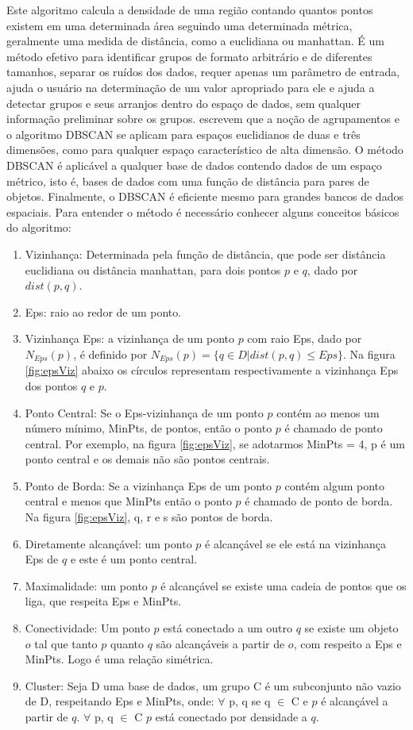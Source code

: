 Este algoritmo calcula a densidade de uma região contando quantos pontos existem em uma determinada área seguindo uma determinada métrica, geralmente uma medida de distância, como a euclidiana ou manhattan. 
É um método efetivo para identificar grupos de formato arbitrário e de diferentes tamanhos, separar os ruídos dos dados, requer apenas um parâmetro de entrada, ajuda o usuário na determinação de um valor apropriado para ele e ajuda a detectar grupos e seus arranjos dentro do espaço de dados, sem qualquer informação preliminar sobre os grupos.
\cite{ESTER1996}  escrevem que a noção de agrupamentos e o algoritmo DBSCAN se aplicam para espaços euclidianos de duas e três dimensões, como para qualquer espaço característico de alta dimensão. O método DBSCAN é aplicável a qualquer base de dados contendo dados de um espaço métrico, isto é, bases de dados com uma função de distância para pares de objetos. Finalmente, o DBSCAN é eficiente mesmo para grandes bancos de dados espaciais.
Para entender o método é necessário conhecer alguns conceitos básicos do algoritmo: 

\begin{enumerate}
	\item Vizinhança: Determinada pela função de distância, que pode ser distância euclidiana ou distância manhattan, para dois pontos ${p}$ e ${q}$, dado por ${dist(p,q)}$.
	\item Eps: raio ao redor de um ponto. 
	\item Vizinhança Eps: a vizinhança de um ponto ${p}$ com raio Eps, dado por ${N_{Eps}(p)}$, é definido por ${N_{Eps}(p) = \big\{ q \in D | dist(p, q)  \leqslant Eps\big\} }$. Na figura \ref{fig:epsViz} abaixo os círculos representam respectivamente a vizinhança Eps dos pontos ${q}$ e ${p}$.
	\item Ponto Central: Se o Eps-vizinhança de um ponto ${p}$ contém ao menos um número mínimo, MinPts, de pontos, então o ponto ${p}$ é chamado de ponto central.
	Por exemplo, na figura \ref{fig:epsViz}, se adotarmos MinPts = 4, p é um ponto central e os demais não são pontos centrais.
	\item Ponto de Borda: Se a vizinhança Eps de um ponto ${p}$ contém algum ponto central e menos que MinPts então o ponto ${p}$ é chamado de ponto de borda. Na figura  \ref{fig:epsViz}, q, r e s são pontos de borda.
	\item Diretamente alcançável: um ponto ${p}$ é alcançável se ele está na vizinhança Eps de ${q}$ e este é um ponto central.
	\item Maximalidade: um ponto ${p}$ é alcançável se existe uma cadeia de pontos que os liga, que respeita Eps e MinPts.
	\item Conectividade: Um ponto ${p}$ está conectado a um outro ${q}$ se existe um objeto ${o}$ tal que tanto ${p}$ quanto ${q}$ são alcançáveis a partir de ${o}$, com respeito a Eps e MinPts. Logo é uma relação simétrica.
	\item Cluster: Seja D uma base de dados, um grupo C é um subconjunto não vazio de D, respeitando Eps e MinPts, onde:
		\subitem ${\forall}$ p, q se q ${\in}$ C e ${p}$ é alcançável a partir de ${q}$.
		\subitem ${\forall}$ p, q ${\in}$ C ${p}$ está conectado por densidade a ${q}$.
\end{enumerate}

